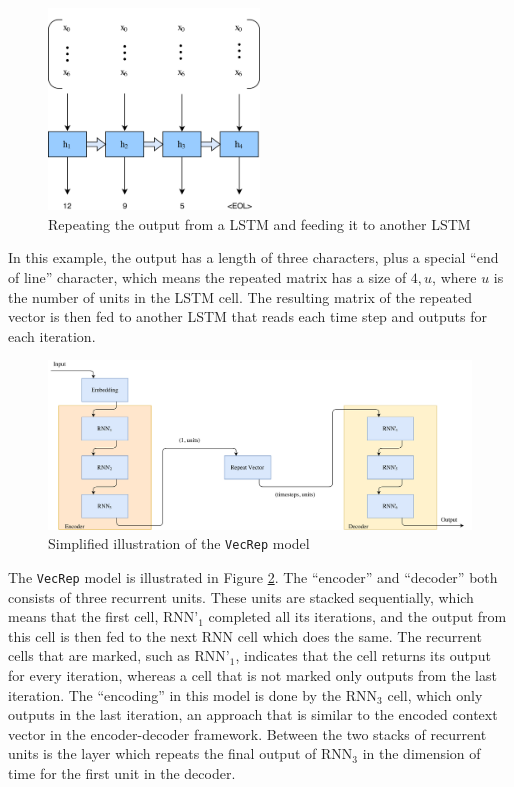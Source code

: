\begin{figure}[ht]
    \centering
    \includegraphics[width=0.5\textwidth]{fig/development_process/lstm-vector-projection-decoder.png}
    \caption{Repeating the output from a LSTM and feeding it to another LSTM}
    \label{fig:lstm-vector-projection-decoder}
\end{figure}

In this example, the output has a length of three characters, plus a special ``end of line'' character, which means the repeated matrix has a size of \(4, u\), where \(u\) is the number of units in the LSTM cell. The resulting matrix of the repeated vector is then fed to another LSTM that reads each time step and outputs for each iteration.

\begin{figure}[!ht]
    \centering
    \includegraphics[width=1\textwidth]{fig/models/vecrep_model.png}
    \caption{Simplified illustration of the {\tt VecRep} model}
    \label{fig:vecrep_model}
\end{figure}

The {\tt VecRep} model is illustrated in Figure \ref{fig:vecrep_model}. The ``encoder'' and ``decoder'' both consists of three recurrent units. These units are stacked sequentially, which means that the first cell, \(\text{RNN'}_1\) completed all its iterations, and the output from this cell is then fed to the next RNN cell which does the same. The recurrent cells that are marked, such as \(\text{RNN'}_1\), indicates that the cell returns its output for every iteration, whereas a cell that is not marked only outputs from the last iteration. The ``encoding'' in this model is done by the \(\text{RNN}_3\) cell, which only outputs in the last iteration, an approach that is similar to the encoded context vector in the encoder-decoder framework. Between the two stacks of recurrent units is the layer which repeats the final output of \(\text{RNN}_3\) in the dimension of time for the first unit in the decoder.

